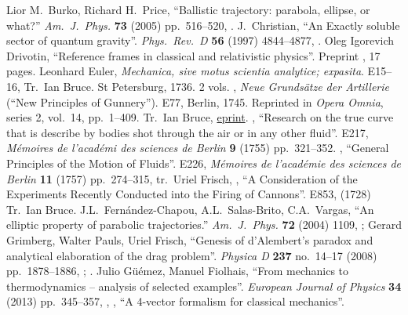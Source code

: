 \begin{thebibliography}{99}\footnotesize%
\setlength{\itemsep}{0pt plus 0.3ex}%
\setlength{\parskip}{0pt}
  Lior M.~Burko, Richard H.~Price,
  ``Ballistic trajectory: parabola, ellipse, or what?''
  \emph{Am.\ J.\ Phys.} {\bf 73} (2005) pp.~516--520,
  . 
  J.~Christian,
  ``An Exactly soluble sector of quantum gravity''.
  \emph{Phys.\ Rev.\ D} {\bf 56} (1997) 4844--4877,
  .
  Oleg Igorevich Drivotin,
  ``Reference frames in classical and relativistic physics''.
  Preprint , 17 pages.
  Leonhard Euler, 
  \emph{Mechanica, sive motus scientia analytice; expasita}.
  E15--16,
  Tr.\ Ian Bruce. St Petersburg, 1736. 2 vols.
  \bysame, 
  \emph{Neue Grunds\"atze der Artillerie} (``New Principles of Gunnery'').
  E77,
  Berlin, 1745. Reprinted in \emph{Opera Omnia}, series 2, vol.~14,
  pp.~1--409. Tr.\ Ian Bruce, \href{http://www.17centurymaths.com/contents/eulerartillery.htm}{eprint}.
  \bysame, 
  ``Research on the true curve that is describe by bodies shot through
  the air or in any other fluid''.
  E217,
  \emph{M\'emoires de l'acad\'emi des sciences de Berlin}
  \textbf{9} (1755) pp.~321--352.
  \bysame, 
  ``General Principles of the Motion of Fluids''.
  E226,
  \emph{M\'emoires de l'acad\'emie des sciences de Berlin}
  {\bf 11} (1757) pp.~274--315, tr.~Uriel Frisch,
  \bysame,
  ``A Consideration of the Experiments Recently Conducted into the
  Firing of Cannons''.
  E853,
  (1728)
  Tr.\ Ian Bruce.
  J.L.~Fern\'andez-Chapou, A.L.~Salas-Brito, C.A.~Vargas,
  ``An elliptic property of parabolic trajectories.''
  \emph{Am.\ J.\ Phys.} \textbf{72} (2004) 1109,
  ;
  Gerard Grimberg, Walter Pauls, Uriel Frisch,
  ``Genesis of d'Alembert's paradox and analytical elaboration of the drag problem''.
  \emph{Physica D} {\bf237} no.~14--17 (2008) pp.~1878--1886,
  ;
  .
  Julio G\"u\'emez, Manuel Fiolhais,
  ``From mechanics to thermodynamics -- analysis of selected examples''.
  \emph{European Journal of Physics} {\bf 34} (2013) pp.~345--357,
  \bysame, \bysame,
  ``A 4-vector formalism for classical mechanics''.

\end{thebibliography}
